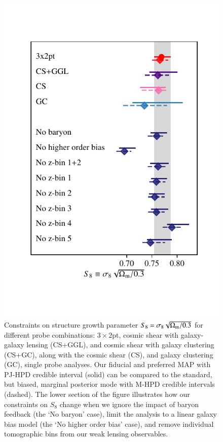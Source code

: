 \begin{figure}
	\begin{center}
		\includegraphics[width=\columnwidth]{Parameter_Plots/systematics/S8_comparison_blindC}
		\caption{Constraints on structure growth parameter $S_{8} = \sigma_8 \sqrt{\Omega_{\rm m}/0.3}$ for different probe combinations: $3\times2$pt, cosmic shear with galaxy-galaxy lensing (CS+GGL), and cosmic shear with galaxy clustering (CS+GC), along with the cosmic shear (CS), and galaxy clustering (GC), single probe analyses.   Our fiducial and preferred MAP with PJ-HPD credible interval (solid) can be compared to the standard, but biased, marginal posterior mode with M-HPD credible intervals (dashed).   The lower section of the figure illustrates how our constraints on $S_8$ change when we ignore the impact of baryon feedback (the `No baryon' case), limit the analysis to a linear galaxy bias model (the `No higher order bias' case), and remove individual tomographic bins from our weak lensing observables.    
		}
		\label{fig:S8comp}
	\end{center}
\end{figure}

